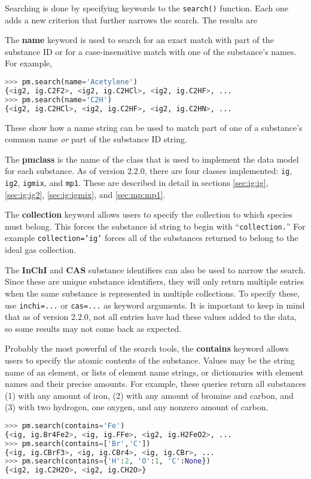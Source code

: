 Searching is done by specifying keywords to the \texttt{search()} function.  Each one adds a new criterion that further narrows the search.  The results are 

The {\bf name} keyword is used to search for an exact match with part of the substance ID or for a case-insensitive match with one of the substance's names.  For example, 
\begin{lstlisting}[language=Python]
>>> pm.search(name='Acetylene')
{<ig2, ig.C2F2>, <ig2, ig.C2HCl>, <ig2, ig.C2HF>, ...
>>> pm.search(name='C2H')
{<ig2, ig.C2HCl>, <ig2, ig.C2HF>, <ig2, ig.C2HN>, ...
\end{lstlisting}

These show how a name string can be used to match part of one of a substance's common name \emph{or} part of the substance ID string.

The {\bf pmclass} is the name of the class that is used to implement the data model for each substance.  As of version 2.2.0, there are four classes implemented: \texttt{ig}, \texttt{ig2}, \texttt{igmix}, and \texttt{mp1}. These are described in detail in sections \ref{sec:ig:ig}, \ref{sec:ig:ig2}, \ref{sec:ig:igmix}, and \ref{sec:mp:mp1}.

The {\bf collection} keyword allows users to specify the collection to which species must belong.  This forces the substance id string to begin with ``\verb|collection.|''  For example \texttt{collection='ig'} forces all of the substances returned to belong to the ideal gas collection.

The {\bf InChI}\cite{inchi:website} and {\bf CAS}\cite{cas:website} substance identifiers can also be used to narrow the search.  Since these are unique substance identifiers, they will only return multiple entries when the same substance is represented in multiple collections.  To specify these, use \texttt{inchi=...} or \texttt{cas=...} as keyword arguments.  It is important to keep in mind that as of version 2.2.0, not all entries have had these values added to the data, so some results may not come back as expected.

Probably the most powerful of the search tools, the {\bf contains} keyword allows users to specify the atomic contents of the substance.  Values may be the string name of an element, or lists of element name strings, or dictionaries with element names and their precise amounts.  For example, these queries return all substances (1) with any amount of iron, (2) with any amount of bromine and carbon, and (3) with two hydrogen, one oxygen, and any nonzero amount of carbon.
\begin{lstlisting}[language=Python]
>>> pm.search(contains='Fe')
{<ig, ig.Br4Fe2>, <ig, ig.FFe>, <ig2, ig.H2FeO2>, ...
>>> pm.search(contains=['Br','C'])
{<ig, ig.CBrF3>, <ig, ig.CBr4>, <ig, ig.CBr>, ...
>>> pm.search(contains={'H':2, 'O':1, 'C':None})
{<ig2, ig.C2H2O>, <ig2, ig.CH2O>}
\end{lstlisting}

